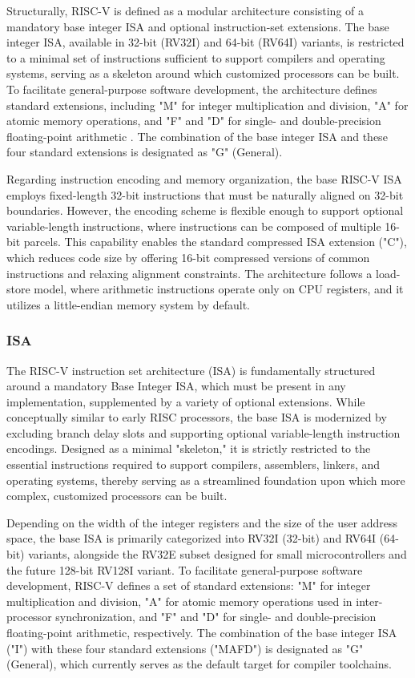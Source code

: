 \documentclass[12pt]{article}
\begin{document}
Structurally, RISC-V is defined as a modular architecture consisting of a mandatory base integer ISA and optional instruction-set extensions. The base integer ISA, available in 32-bit (RV32I) and 64-bit (RV64I) variants, is restricted to a minimal set of instructions sufficient to support compilers and operating systems, serving as a skeleton around which customized processors can be built. To facilitate general-purpose software development, the architecture defines standard extensions, including "M" for integer multiplication and division, "A" for atomic memory operations, and "F" and "D" for single- and double-precision floating-point arithmetic . The combination of the base integer ISA and these four standard extensions is designated as "G" (General).

Regarding instruction encoding and memory organization, the base RISC-V ISA employs fixed-length 32-bit instructions that must be naturally aligned on 32-bit boundaries. However, the encoding scheme is flexible enough to support optional variable-length instructions, where instructions can be composed of multiple 16-bit parcels. This capability enables the standard compressed ISA extension ("C"), which reduces code size by offering 16-bit compressed versions of common instructions and relaxing alignment constraints. The architecture follows a load-store model, where arithmetic instructions operate only on CPU registers, and it utilizes a little-endian memory system by default.

\subsubsection{ISA}
The RISC-V instruction set architecture (ISA) is fundamentally structured around a mandatory Base Integer ISA, which must be present in any implementation, supplemented by a variety of optional extensions. While conceptually similar to early RISC processors, the base ISA is modernized by excluding branch delay slots and supporting optional variable-length instruction encodings. Designed as a minimal "skeleton," it is strictly restricted to the essential instructions required to support compilers, assemblers, linkers, and operating systems, thereby serving as a streamlined foundation upon which more complex, customized processors can be built.

Depending on the width of the integer registers and the size of the user address space, the base ISA is primarily categorized into RV32I (32-bit) and RV64I (64-bit) variants, alongside the RV32E subset designed for small microcontrollers and the future 128-bit RV128I variant. To facilitate general-purpose software development, RISC-V defines a set of standard extensions: "M" for integer multiplication and division, "A" for atomic memory operations used in inter-processor synchronization, and "F" and "D" for single- and double-precision floating-point arithmetic, respectively. The combination of the base integer ISA ("I") with these four standard extensions ("MAFD") is designated as "G" (General), which currently serves as the default target for compiler toolchains.
\end{document}
